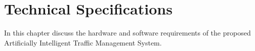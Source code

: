 \documentclass[openany,12pt]{report}
\begin{document}
	\chapter{Technical Specifications}
	\hspace*{0.5in}In this chapter discuss the hardware and software requirements of the proposed Artificially Intelligent Traffic Management System.
	

\end{document}
